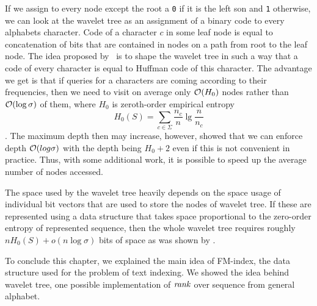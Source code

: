 If we assign to every node except the root a {\tt 0} if it is the left son and {\tt 1}
otherwise, we can look at the wavelet tree as an assignment of a binary code to every
alphabets character. Code of a character $c$ in some leaf node is equal to concatenation of
bits that are contained in nodes on a path from root to the leaf node. The idea proposed
by~\cite{makinen2005succinct} is to shape the wavelet tree in such a way that a code of every
character is equal to Huffman code of this character. The advantage we get is that if queries
for a characters are coming according to their frequencies, then we need to visit on average
only $\mathcal{O}(H_0)$ nodes rather than $\mathcal{O}(\log \sigma)$ of them, where $H_0$ is zeroth-order empirical
entropy $$H_0(S)=\sum_{c\in\Sigma} \frac{n_c}{n} \lg \frac{n}{n_c}$$. The maximum depth then
may increase, however, \cite{grabowski2004first} showed that we can enforce depth
$\mathcal{O}(log \sigma)$ with the depth being $H_0+2$ even if this is not convenient in practice.
Thus, with some additional work, it is possible to speed up the average number of nodes accessed.

The space used by the wavelet tree heavily depends on the space usage of individual bit vectors
that are used to store the nodes of wavelet tree. If these are represented using a data structure
that takes space proportional to the zero-order entropy of represented sequence, then the whole
wavelet tree requires roughly $nH_0(S) + o(n\log\sigma)$ bits of space as was shown by
\cite{grossi2003high}.

To conclude this chapter, we explained the main idea of FM-index, the data structure used for the
problem of text indexing. We showed the idea behind wavelet tree, one possible implementation of
$\mathit{rank}$ over sequence from general alphabet.

